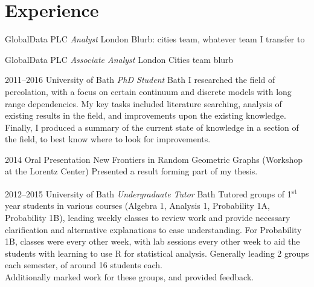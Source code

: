 \documentclass[print, oneside]{friggeri-cv} %
\begin{document}
\pagebreak

\section{Experience}


\begin{entrylist}

{GlobalData PLC {\normalfont \emph{Analyst}}}
{London}
{Blurb: cities team, whatever team I transfer to}

{GlobalData PLC {\normalfont \emph{Associate Analyst}}}
{London}
{Cities team blurb}


\entry
{2011--2016}
{University of Bath {\normalfont \emph{PhD Student}}}
{Bath}
{I researched the field of percolation, with a focus on certain continuum and discrete models with long range dependencies. My key tasks included literature searching, analysis of existing results in the field, and improvements upon the existing knowledge. Finally, I produced a summary of the current state of knowledge in a section of the field, to best know where to look for improvements.}

\entry
{2014}
{Oral Presentation}
{New Frontiers in Random Geometric Graphs (Workshop at the Lorentz Center)}
{Presented a result forming part of my thesis.}




\entry
{2012--2015}
{University of Bath {\normalfont \emph{Undergraduate Tutor}}}
{Bath}
{Tutored groups of 1\textsuperscript{st} year students in various courses (Algebra 1, Analysis 1, Probability 1A, Probability 1B), leading weekly classes to review work and provide necessary clarification and alternative explanations to ease understanding. For Probability 1B, classes were every other week, with lab sessions every other week to aid the students with learning to use R for statistical analysis. Generally leading 2 groups each semester, of around 16 students each.\\
Additionally marked work for these groups, and provided feedback.}


\end{entrylist}
\end{document}
